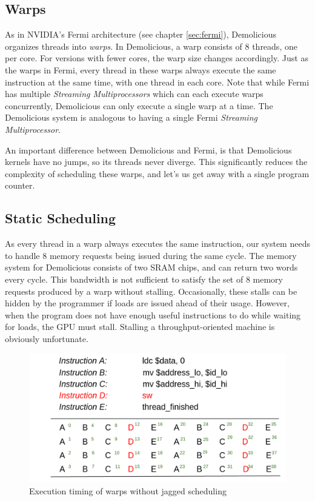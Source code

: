 \documentclass[../main/report.tex]{subfiles}
\begin{document}
\subsection{Warps}

As in NVIDIA's Fermi architecture (see chapter \ref{sec:fermi}), Demolicious organizes threads into \emph{warps}.
In Demolicious, a warp consists of 8 threads, one per core.
For versions with fewer cores, the warp size changes accordingly.
Just as the warps in Fermi, every thread in these warps always execute the same instruction at the same time, with one thread in each core.
Note that while Fermi has multiple \emph{Streaming Multiprocessors} which can each execute warps concurrently, Demolicious can only execute a single warp at a time.
The Demolicious system is analogous to having a single Fermi \emph{Streaming Multiprocessor}.

An important difference between Demolicious and Fermi, is that Demolicious kernels have no jumps, so its threads never diverge.
This significantly reduces the complexity of scheduling these warps, and let's us get away with a single program counter.

\subsection{Static Scheduling}

As every thread in a warp always executes the same instruction, our system needs to handle 8 memory requests being issued during the same cycle.
The memory system for Demolicious consists of two SRAM chips, and can return two words every cycle.
This bandwidth is not sufficient to satisfy the set of 8 memory requests produced by a warp without stalling.
Occasionally, these stalls can be hidden by the programmer if loads are issued ahead of their usage.
However, when the program does not have enough useful instructions to do while waiting for loads, the GPU must stall.
Stalling a throughput-oriented machine is obviously unfortunate.

\begin{figure}[htp]
\centering
\includegraphics[scale=0.25]{../gpu/diagrams/uten_jaktstart_num.png}
\caption{Execution timing of warps without jagged scheduling}
\label{fig:nojagged}
\end{figure}
\end{document}
